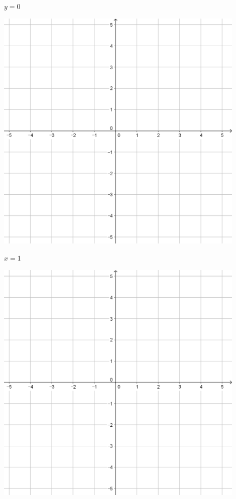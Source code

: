\documentclass[a4paper]{oblivoir}
\begin{document}
\begin{minipage}{0.45\textwidth}\centering
\(y=0\)
\par\bigskip\includegraphics[width=0.9\textwidth]{55}
\end{minipage}
\begin{minipage}{0.45\textwidth}\centering
\(x=1\)
\par\bigskip\includegraphics[width=0.9\textwidth]{55}
\end{minipage}\bigskip\bigskip\par
\end{document}
